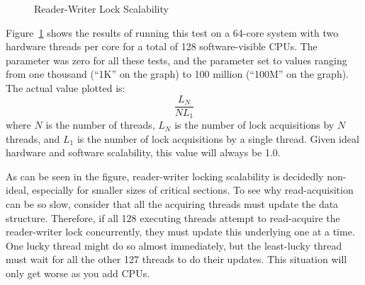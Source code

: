\begin{figure}[tb]
\centering
{}
\caption{Reader-Writer Lock Scalability}
\label{fig:toolsoftrade:Reader-Writer Lock Scalability}
\end{figure}

Figure~\ref{fig:toolsoftrade:Reader-Writer Lock Scalability}
shows the results of running this test on a 64-core  system
with two hardware threads per core for a total of 128 software-visible
CPUs.
The  parameter was zero for all these tests, and the
 parameter set to values ranging from one thousand (``1K''
on the graph) to 100 million (``100M'' on the graph).
The actual value plotted is:
\begin{equation}
	\frac{L_N}{N L_1}
\end{equation}
where $N$ is the number of threads,
$L_N$ is the number of lock acquisitions by $N$ threads, and
$L_1$ is the number of lock acquisitions by a single thread.
Given ideal hardware and software scalability, this value will always
be 1.0.

As can be seen in the figure, reader-writer locking scalability is
decidedly non-ideal, especially for smaller sizes of critical
sections.
To see why read-acquisition can be so slow, consider
that all the acquiring threads must update the 
data structure.
Therefore, if all 128 executing threads attempt to
read-acquire the reader-writer lock concurrently, they must update
this underlying  one at a time.
One lucky thread might do so almost immediately, but the least-lucky
thread must wait for all the other 127 threads to do their updates.
This situation will only get worse as you add CPUs.

